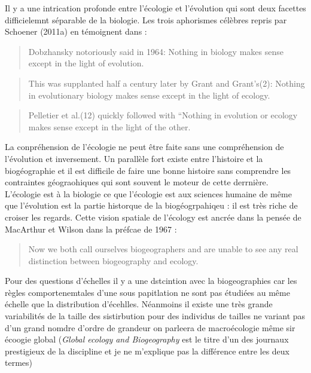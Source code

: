 Il y a une intrication profonde entre l'écologie et l'évolution qui sont
deux facettes difficielemnt séparable de la biologie. Les trois
aphorismes célèbres repris par Schoener (2011a) en témoignent dans :

\begin{quote}
\guillemotleft Dobzhansky notoriously said in 1964: Nothing in biology
makes sense except in the light of evolution. \guillemotright
\end{quote}

\begin{quote}
\guillemotleft This was supplanted half a century later by Grant and
Grant's(2): Nothing in evolutionary biology makes sense except in the
light of ecology. \guillemotright
\end{quote}

\begin{quote}
Pelletier et al.(12) quickly followed with ``Nothing in evolution or
ecology makes sense except in the light of the other. \guillemotright
\end{quote}

La conpréhension de l'écologie ne peut être faite sans une compréhension
de l'évolution et inversement. Un parallèle fort existe entre l'histoire
et la biogéographie et il est difficile de faire une bonne histoire sans
comprendre les contraintes géograohiques qui sont souvent le moteur de
cette derrnière. L'écologie est à la biologie ce que l'écologie est aux
sciences humaine de même que l'évolution est la partie historque de la
biogéogrpahiqeu : il est très riche de croiser les regards. Cette vision
spatiale de l'écology est ancrée dans la pensée de MacArthur et Wilson
dans la préfcae de 1967 :

\begin{quote}
\guillemotleft Now we both call ourselves biogeographers and are unable
to see any real distinction between biogeography and ecology.
\guillemotright
\end{quote}

Pour des questions d'échelles il y a une dstcintion avec la
biogeographies car les règles comportenemtales d'une sous papitlation ne
sont pas étudiées au même échelle que la distribution d'écehlles.
Néanmoins il existe une très grande variabilités de la taille des
sistirbution pour des individus de tailles ne variant pas d'un grand
nomdre d'ordre de grandeur on parleera de macroécologie même sir écoogie
global (\emph{Global ecology and Biogeography} est le titre d'un des
journaux prestigieux de la discipline et je ne m'explique pas la
différence entre les deux termes)


